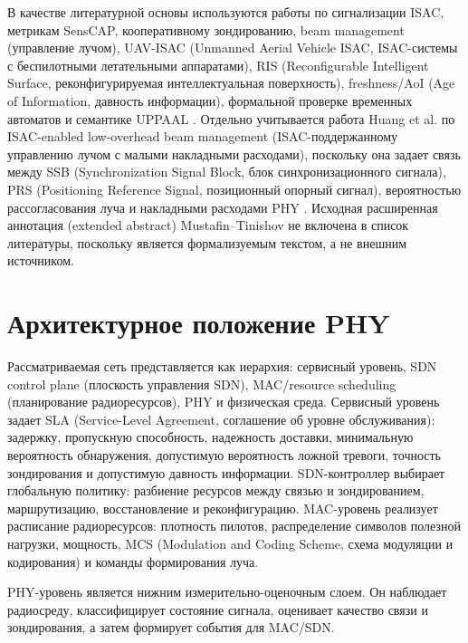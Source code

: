 \documentclass[12pt,a4paper]{article}
\begin{document}
В качестве литературной основы используются работы по сигнализации ISAC, метрикам SensCAP, кооперативному зондированию, beam management (управление лучом), UAV-ISAC (Unmanned Aerial Vehicle ISAC, ISAC-системы с беспилотными летательными аппаратами), RIS (Reconfigurable Intelligent Surface, реконфигурируемая интеллектуальная поверхность), freshness/AoI (Age of Information, давность информации), формальной проверке временных автоматов и семантике UPPAAL \cite{li2025rethinking,liu2024senscap,liu2026cooperative,qaisar2026role,luo2024framework,huang2026beam,zanni2026aoi,ahmed2025uav,chen2026trajectory,wu2026ris,chen2026array,anand2007afdx,uppaaldocs}. Отдельно учитывается работа Huang et al. по ISAC-enabled low-overhead beam management (ISAC-поддержанному управлению лучом с малыми накладными расходами), поскольку она задает связь между SSB (Synchronization Signal Block, блок синхронизационного сигнала), PRS (Positioning Reference Signal, позиционный опорный сигнал), вероятностью рассогласования луча и накладными расходами PHY \cite{huang2026beam}. Исходная расширенная аннотация (extended abstract) Mustafin--Tinishov не включена в список литературы, поскольку является формализуемым текстом, а не внешним источником.

\section{Архитектурное положение PHY}

Рассматриваемая сеть представляется как иерархия: сервисный уровень, SDN control plane (плоскость управления SDN), MAC/resource scheduling (планирование радиоресурсов), PHY и физическая среда. Сервисный уровень задает SLA (Service-Level Agreement, соглашение об уровне обслуживания): задержку, пропускную способность, надежность доставки, минимальную вероятность обнаружения, допустимую вероятность ложной тревоги, точность зондирования и допустимую давность информации. SDN-контроллер выбирает глобальную политику: разбиение ресурсов между связью и зондированием, маршрутизацию, восстановление и реконфигурацию. MAC-уровень реализует расписание радиоресурсов: плотность пилотов, распределение символов полезной нагрузки, мощность, MCS (Modulation and Coding Scheme, схема модуляции и кодирования) и команды формирования луча.

PHY-уровень является нижним измерительно-оценочным слоем. Он наблюдает радиосреду, классифицирует состояние сигнала, оценивает качество связи и зондирования, а затем формирует события для MAC/SDN.
\end{document}
